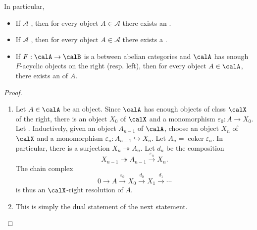 \begin{lemma} 
In particular,
\begin{itemize}
    \item If $\mathcal{A}$ , then for every object $A \in \mathcal{A}$ there exists an .
    \item If $\mathcal{A}$ , then for every object $A \in \mathcal{A}$ there exists a .
    \item If $F: \calA \to \calB$ is a  between abelian categories and $\calA$ has enough $F$-acyclic objects on the right (resp. left), then for every object $A \in \calA$, there exists an  of $A$.
\end{itemize}

\end{lemma}
\begin{proof}
    \begin{enumerate}
        \item Let $A \in \calA$ be an object. Since $\calA$ has enough objects of class $\calX$ of the right, there is an object $X_0$ of $\calX$ and a monomorphism $\varepsilon_0: A \to X_0$. Let . Inductively, given an object $A_{n-1}$ of $\calA$, choose an object $X_n$ of $\calX$ and a monomorphism $\varepsilon_{n}: A_{n-1} \hookrightarrow X_n$. Let $A_n = \operatorname{coker} \varepsilon_n$. In particular, there is a surjection $X_n \twoheadrightarrow A_n$. Let $d_n$ be the composition
        $$X_{n-1} \twoheadrightarrow A_{n-1} \xrightarrow{\varepsilon_n} X_n.$$
        The chain complex
        $$0 \to A \xrightarrow{\varepsilon_0} X_0 \xrightarrow{d_0} X_1 \xrightarrow{d_1} \cdots$$
        is thus an $\calX$-right resolution of $A$.

        \item This is simply the dual statement of the next statement.

    \end{enumerate} 
\end{proof}